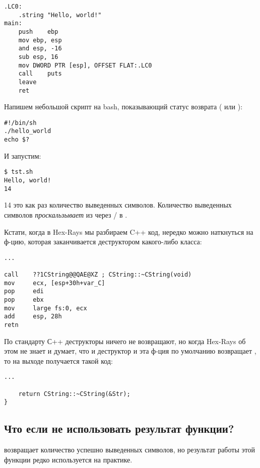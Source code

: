 \begin{lstlisting}[caption=GCC 4.8.1,style=customasmx86]
.LC0:
	.string	"Hello, world!"
main:
	push	ebp
	mov	ebp, esp
	and	esp, -16
	sub	esp, 16
	mov	DWORD PTR [esp], OFFSET FLAT:.LC0
	call	puts
	leave
	ret
\end{lstlisting}

Напишем небольшой скрипт на bash, показывающий статус возврата ( или ):

\begin{lstlisting}[caption=tst.sh]
#!/bin/sh
./hello_world
echo $?
\end{lstlisting}

И запустим:

\begin{lstlisting}
$ tst.sh 
Hello, world!
14
\end{lstlisting}

14 это как раз количество выведенных символов.
Количество выведенных символов \textit{проскальзывает} из \printf{} через / в .


Кстати, когда в Hex-Rays мы разбираем C++ код, нередко можно наткнуться на ф-цию, которая заканчивается
деструктором какого-либо класса:

\begin{lstlisting}
...

call    ??1CString@@QAE@XZ ; CString::~CString(void)
mov     ecx, [esp+30h+var_C]
pop     edi
pop     ebx
mov     large fs:0, ecx
add     esp, 28h
retn
\end{lstlisting}

По стандарту С++ деструкторы ничего не возвращают, но когда Hex-Rays об этом не знает и думает, что и деструктор
и эта ф-ция по умолчанию возвращает \Tint, то на выходе получается такой код:

\begin{lstlisting}[style=customc]
...

	return CString::~CString(&Str);
}
\end{lstlisting}

\subsection{Что если не использовать результат функции?}

\printf возвращает количество успешно выведенных символов, но результат работы этой функции 
редко используется на практике.

